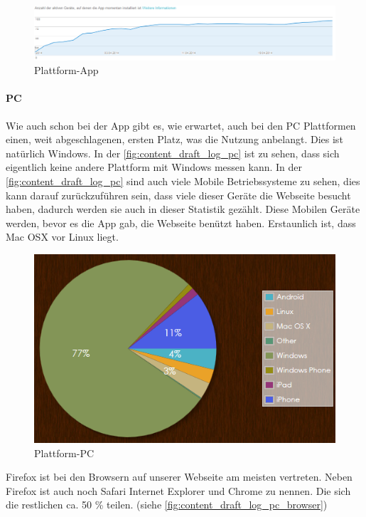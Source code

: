 \begin{figure}[H]
\centering
\includegraphics[keepaspectratio=true, width=17cm]{images/screenshots/statistics/app_install.png}
\caption{Plattform-App}
\label{fig:content_draft_log_app_install}
\end{figure}

\paragraph{PC\\}
Wie auch schon bei der App gibt es, wie erwartet, auch bei den PC Plattformen einen, weit abgeschlagenen, ersten Platz, was die Nutzung anbelangt. Dies ist natürlich Windows. In der \autoref{fig:content_draft_log_pc} ist zu sehen, dass sich eigentlich keine andere Plattform mit Windows messen kann. In der \autoref{fig:content_draft_log_pc} sind auch viele Mobile Betriebssysteme zu sehen, dies kann darauf zurückzuführen sein, dass viele dieser Geräte die Webseite besucht haben, dadurch werden sie auch in dieser Statistik gezählt. Diese Mobilen Geräte werden, bevor es die App gab, die Webseite benützt haben. Erstaunlich ist, dass Mac OSX vor Linux liegt.
\begin{figure}[H]
\centering
\includegraphics[keepaspectratio=true, width=12cm]{images/screenshots/statistics/pc_plattform.png}
\caption{Plattform-PC}
\label{fig:content_draft_log_pc}
\end{figure}

Firefox ist bei den Browsern auf unserer Webseite am meisten vertreten. Neben Firefox ist auch noch Safari Internet Explorer und Chrome zu nennen. Die sich die restlichen ca. 50 \% teilen. (siehe \autoref{fig:content_draft_log_pc_browser})

